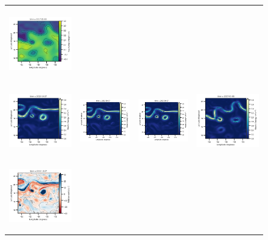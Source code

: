 \begin{figure}[ht!]
\begin{center}
\begin{tabular}{cccc}
\includegraphics[trim={13mm 13mm 0 0},clip,width=4.0cm,height=3.2cm]{content/figures/fourdvarnet_figs/ose_gf_ssh.png} \\
\includegraphics[trim={0 13mm 22mm 5mm}, clip, width=3.60cm,height=3cm]{content/figures/fourdvarnet_figs/osse_gf_nadir_ke.png} &
\includegraphics[trim={13mm 13mm 22mm 5mm},clip, width=3.2cm,height=3cm]{content/figures/fourdvarnet_figs/osse_gf_nadirswot_ke.png} &
\includegraphics[trim={13mm 13mm 22mm 5mm},clip, width=3.2cm,height=3cm]{content/figures/fourdvarnet_figs/osse_gf_nadir_sst_ke.png} &
\includegraphics[trim={13mm 13mm 0 5mm},clip,width=4cm,height=3cm]{content/figures/fourdvarnet_figs/ose_gf_ke.png} \\
\includegraphics[trim={0 13mm 21.2mm 5mm},clip, width=3.60cm,height=3cm]{content/figures/fourdvarnet_figs/osse_gf_nadir_vort_r.png} &

\end{tabular}
\end{center}
\end{figure}
